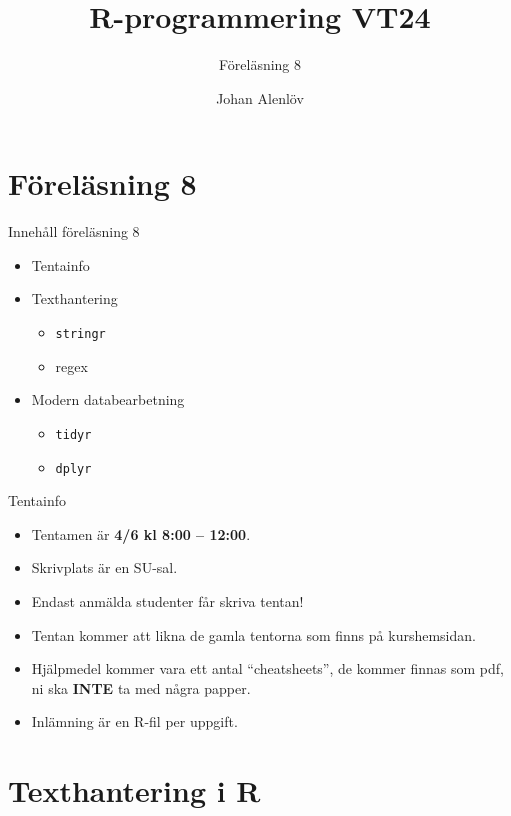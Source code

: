 \documentclass[
  10pt,
  ignorenonframetext,
  handout]{beamer}
\title{R-programmering VT24}
\subtitle{Föreläsning 8}
\author{Johan Alenlöv}
\date{}
\institute{Linköpings Universitet}
\providecommand{\tightlist}{%
  \setlength{\itemsep}{0pt}\setlength{\parskip}{0pt}}
\begin{document}
\frame{\titlepage}

\section{Föreläsning 8}\label{fuxf6reluxe4sning-8}

\begin{frame}{Innehåll föreläsning 8}
\label{innehuxe5ll-fuxf6reluxe4sning-8}
\begin{itemize}
\tightlist
\item
  Tentainfo
\item
  Texthantering

  \begin{itemize}
  \tightlist
  \item
    \texttt{stringr}
  \item
    regex
  \end{itemize}
\item
  Modern databearbetning

  \begin{itemize}
  \tightlist
  \item
    \texttt{tidyr}
  \item
    \texttt{dplyr}
  \end{itemize}
\end{itemize}
\end{frame}

\begin{frame}{Tentainfo}
\label{tentainfo}
\begin{itemize}
\tightlist
\item
  Tentamen är \textbf{4/6 kl 8:00 -- 12:00}.
\item
  Skrivplats är en SU-sal.
\item
  Endast anmälda studenter får skriva tentan!
\item
  Tentan kommer att likna de gamla tentorna som finns på kurshemsidan.
\item
  Hjälpmedel kommer vara ett antal ``cheatsheets'', de kommer finnas som
  pdf, ni ska \textbf{INTE} ta med några papper.
\item
  Inlämning är en R-fil per uppgift.
\end{itemize}
\end{frame}

\section{Texthantering i R}\label{texthantering-i-r}
\end{document}
